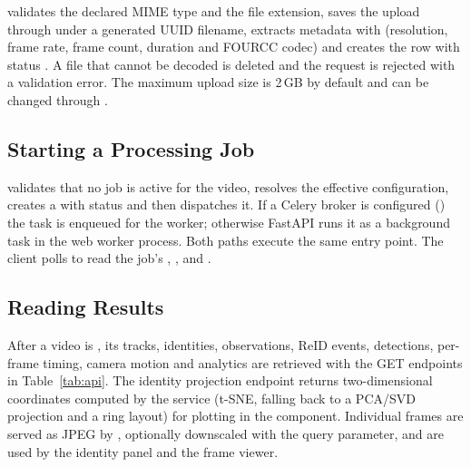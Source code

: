  validates the declared MIME type and the file extension, saves the upload through  under a generated UUID filename, extracts metadata with  (resolution, frame rate, frame count, duration and FOURCC codec) and creates the  row with status . A file that cannot be decoded is deleted and the request is rejected with a validation error. The maximum upload size is 2\,GB by default and can be changed through .

\subsection{Starting a Processing Job}

 validates that no job is active for the video, resolves the effective configuration, creates a  with status  and then dispatches it. If a Celery broker is configured () the task is enqueued for the worker; otherwise FastAPI runs it as a background task in the web worker process. Both paths execute the same  entry point. The client polls  to read the job's , ,  and .


\subsection{Reading Results}

After a video is , its tracks, identities, observations, ReID events, detections, per-frame timing, camera motion and analytics are retrieved with the GET endpoints in Table~\ref{tab:api}. The identity projection endpoint returns two-dimensional coordinates computed by the  service (t-SNE, falling back to a PCA/SVD projection and a ring layout) for plotting in the  component. Individual frames are served as JPEG by , optionally downscaled with the  query parameter, and are used by the identity panel and the frame viewer.

